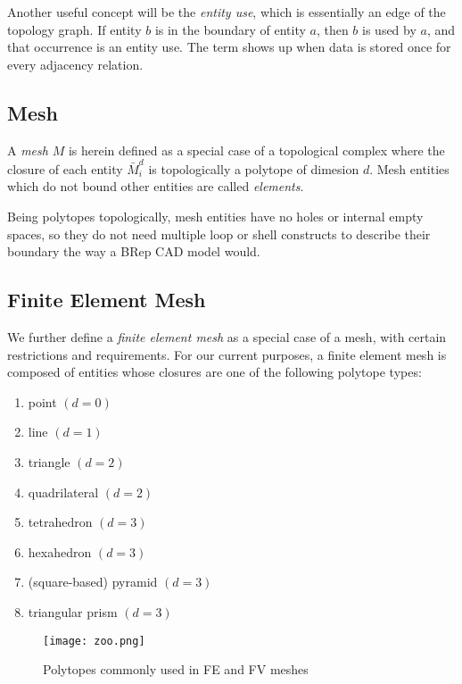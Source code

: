 Another useful concept will be the {\it entity use},
which is essentially an edge of the topology graph.
If entity $b$ is in the boundary of entity $a$, then
$b$ is used by $a$, and that occurrence is an entity use.
The term shows up when data is stored once for every adjacency relation.

\subsection{Mesh}
\label{sec:def_mesh}

A {\it mesh} $M$ is herein defined as a special case of a topological
complex where the closure of each entity $\bar{M}^d_i$
is topologically a polytope of dimesion $d$.
Mesh entities which do not bound other entities
are called \emph{elements}.

Being polytopes topologically, mesh entities have no
holes or internal empty spaces,
so they do not need multiple loop or shell constructs to
describe their boundary the way a BRep CAD model would.

\subsection{Finite Element Mesh}
\label{sec:def_fem}

We further define a {\it finite element mesh} as a special case
of a mesh, with certain restrictions and requirements.
For our current purposes, a finite element mesh is composed
of entities whose closures are one of the following
polytope types:

\begin{enumerate}
\item point $(d = 0)$
\item line $(d = 1)$
\item triangle $(d = 2)$
\item quadrilateral $(d = 2)$
\item tetrahedron $(d = 3)$
\item hexahedron $(d = 3)$
\item (square-based) pyramid $(d = 3)$
\item triangular prism $(d = 3)$
\end{enumerate}

\begin{figure}
\begin{center}
\texttt{[image: zoo.png]}
\caption{Polytopes commonly used in FE and FV meshes}
\label{fig:zoo}
\end{center}
\end{figure}


